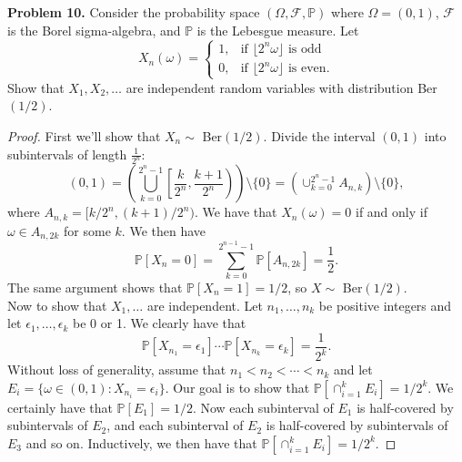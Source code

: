 \documentclass[11pt,letterpaper]{report}
\newcommand{\mcal}[1]{\mathcal{#1}}
\newcommand{\Prob}{\mathbb{P}}
\begin{document}
\noindent\textbf{Problem 10. }
Consider the probability space $(\Omega, \mcal{F}, \Prob)$ where $\Omega = (0,1)$, $\mcal{F}$ is the Borel sigma-algebra, and $\Prob$ is the Lebesgue measure. Let
\[
X_n(\omega) = \begin{cases}
	1,&\text{if }\lfloor 2^n\omega\rfloor\text{ is odd}\\
	0,&\text{if }\lfloor 2^n\omega\rfloor\text{ is even}.
\end{cases}
\]
Show that $X_1, X_2, \ldots$ are independent random variables with distribution Ber$(1/2)$.
\begin{proof}
	First we'll show that $X_n\sim$ Ber$(1/2)$. Divide the interval $(0,1)$ into subintervals of length $\frac{1}{2^n}$:
	\[
	(0,1) = \left(\bigcup_{k=0}^{2^n-1}\left[\frac{k}{2^n}, \frac{k+1}{2^n}\right)\right)\setminus\{0\} = \left(\cup_{k=0}^{2^n-1}A_{n,k}\right)\setminus \{0\},
	\]
	where $A_{n,k} = [k/2^n, (k+1)/2^n)$. We have that $X_n(\omega) = 0$ if and only if $\omega \in A_{n,2k}$ for some $k$. We then have
	\[
	\Prob[X_n = 0] = \sum_{k=0}^{2^{n-1}-1}\Prob[A_{n,2k}] = \frac{1}{2}.
	\]
	The same argument shows that $\Prob[X_n = 1] = 1/2$, so $X\sim$ Ber$(1/2)$.\\

	\noindent Now to show that $X_1, \ldots$ are independent. Let $n_1, \ldots, n_k$ be positive integers and let $\epsilon_1, \ldots, \epsilon_k$ be 0 or 1. We clearly have that
	\[
	\Prob[X_{n_1} = \epsilon_1]\cdots \Prob[X_{n_k} = \epsilon_k] = \frac{1}{2^k}.
	\]
	Without loss of generality, assume that $n_1<n_2<\cdots<n_k$ and let $E_i = \{\omega\in (0,1): X_{n_i} = \epsilon_i\}$. Our goal is to show that $\Prob[\cap_{i=1}^k E_i] = 1/2^k$. We certainly have that $\Prob[E_1] = 1/2$. Now each subinterval of $E_1$ is half-covered by subintervals of $E_2$, and each subinterval of $E_2$ is half-covered by subintervals of $E_3$ and so on. Inductively, we then have that $\Prob[\cap_{i=1}^kE_i] = 1/2^k$.
\end{proof}
\end{document}
